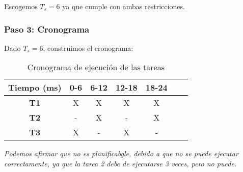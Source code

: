 \documentclass[a4paper,12pt]{article}
\begin{document}
Escogemos \(T_s = 6\) ya que cumple con ambas restricciones.

\subsubsection{Paso 3: Cronograma}
Dado \(T_s = 6\), construimos el cronograma:

\begin{table}[H]
\centering
\begin{tabular}{|c|c|c|c|c|c|c|}
\hline
\textbf{Tiempo (ms)} & 0-6 & 6-12 & 12-18 & 18-24 \\ \hline
\textbf{T1} & X & X & X & X \\
\textbf{T2} & - & X & - & X \\
\textbf{T3} & X & - & X & - \\
\hline
\end{tabular}
\caption{Cronograma de ejecución de las tareas}
\end{table}


\textit{Podemos afirmar que no es planificabgle, debido a que no se puede ejecutar correctamente, ya que la tarea 2 debe de ejecutarse 3 veces, pero no puede.}




                
\end{document}
